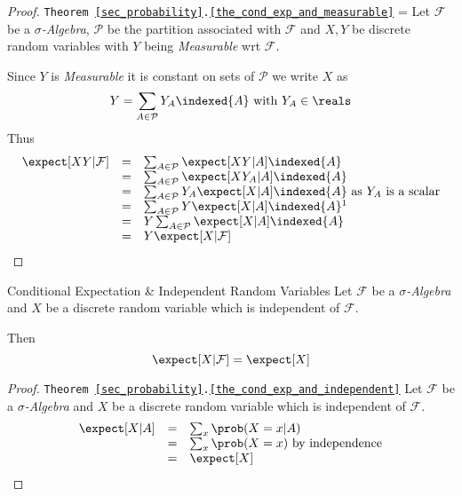 \documentclass[11pt,a4paper]{article}
\begin{document}
  \begin{proof}{\texttt{Theorem \ref{sec_probability}.\ref{the_cond_exp_and_measurable}}}\label{proof_cond_exp_and_measurable}
    \everymath={\displaystyle}
    Let $\mathcal{F}$ be a \textit{$\sigma$-Algebra}, $\mathcal{P}$ be the partition associated with $\mathcal{F}$ and $X,Y$ be discrete random variables with $Y$ being \textit{Measurable} wrt $\mathcal{F}$.
    \par Since $Y$ is \textit{Measurable} it is constant on sets of $\mathcal{P}$ we write $X$ as
    \[ Y=\sum_{A\in\mathcal{P}}Y_A\indexed\{A\}\text{ with }Y_A\in\reals \]
    Thus
    \[\begin{array}{rcl}
      \expect[XY|\mathcal{F}]&=&\sum_{A\in\mathcal{P}}\expect[XY|A]\indexed\{A\}\\
      &=&\sum_{A\in\mathcal{P}}\expect[XY_A|A]\indexed\{A\}\\
      &=&\sum_{A\in\mathcal{P}}Y_A\expect[X|A]\indexed\{A\}\text{ as }Y_A\text{ is a scalar}\\
      &=&\sum_{A\in\mathcal{P}}Y\expect[X|A]\indexed\{A\}\footnotemark\\
      &=&Y\sum_{A\in\mathcal{P}}\expect[X|A]\indexed\{A\}\\
      &=&Y\expect[X|\mathcal{F}]
    \end{array}\]
    \proved
  \end{proof}

  \begin{theorem}{Conditional Expectation \& Independent Random Variables}\label{the_cond_exp_and_independent}
    Let $\mathcal{F}$ be a \textit{$\sigma$-Algebra} and $X$ be a discrete random variable which is independent of $\mathcal{F}$.
    \par Then
    \[ \expect[X|\mathcal{F}]=\expect[X] \]
  \end{theorem}

  \begin{proof}{\texttt{Theorem \ref{sec_probability}.\ref{the_cond_exp_and_independent}}}
    Let $\mathcal{F}$ be a \textit{$\sigma$-Algebra} and $X$ be a discrete random variable which is independent of $\mathcal{F}$.
    \[\begin{array}{rcl}
      \expect[X|A]&=&\sum_x\prob(X=x|A)\\
      &=&\sum_x\prob(X=x)\text{ by independence}\\
      &=&\expect[X]
    \end{array}\]
    \proved
  \end{proof}
\end{document}

